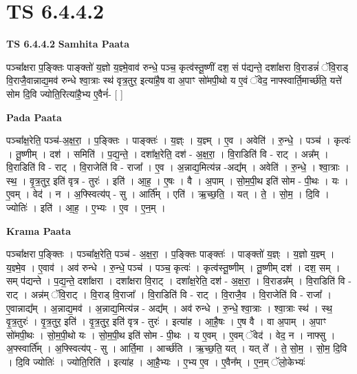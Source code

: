 \documentclass[17pt]{extarticle}
\begin{document}
\section{ TS 6.4.4.2 }

\textbf{TS 6.4.4.2 } \newline
\textbf{Samhita Paata} \newline

पञ्चा᳚क्षरा प॒ङ्क्तिः पाङ्क्तो॑ य॒ज्ञो य॒ज्ञ्मे॒वाव॑ रुन्धे॒ पञ्च॒ कृत्व॑स्तू॒ष्णीं दश॒ सं प॑द्यन्ते॒ दशा᳚क्षरा वि॒राडन्नं॑ ॅवि॒राड् वि॒राजै॒वान्नाद्य॒मव॑ रुन्धे श्वा॒त्राः स्थ॑ वृत्र॒तुर॒ इत्या॑है॒ष वा अ॒पाꣳ सो॑मपी॒थो य ए॒वं ॅवेद॒ नाफ्स्वार्ति॒मार्च्छ॑ति॒ यत्ते॑ सोम दि॒वि ज्योति॒रित्या॑है॒भ्य ए॒वैनं॑- [  ] \newline

\textbf{Pada Paata} \newline

पञ्चा᳚क्ष॒रेति॒ पञ्च॑-अ॒क्ष॒रा॒ । प॒ङ्क्तिः । पाङ्क्तः॑ । य॒ज्ञ्ः । य॒ज्ञ्म् । ए॒व । अवेति॑ । रु॒न्धे॒ । पञ्च॑ । कृत्वः॑ । तू॒ष्णीम् । दश॑ । समिति॑ । प॒द्य॒न्ते॒ । दशा᳚क्ष॒रेति॒ दश॑ - अ॒क्ष॒रा॒ । वि॒राडिति॑ वि - राट् । अन्न᳚म् । वि॒राडिति॑ वि - राट् । वि॒राजेति॑ वि - राजा᳚ । ए॒व । अ॒न्नाद्य॒मित्य॑न्न -अद्य᳚म् । अवेति॑ । रु॒न्धे॒ । श्वा॒त्राः । स्थ॒ । वृ॒त्र॒तुर॒ इति॑ वृत्र - तुरः॑ । इति॑ । आ॒ह॒ । ए॒षः । वै । अ॒पाम् । सो॒म॒पी॒थ इति॑ सोम - पी॒थः । यः । ए॒वम् । वेद॑ । न । अ॒फ्स्वित्य॑प् - सु । आर्ति᳚म् । एति॑ । ऋ॒च्छ॒ति॒ । यत् । ते॒ । सो॒म॒ । दि॒वि । ज्योतिः॑ । इति॑ । आ॒ह॒ । ए॒भ्यः । ए॒व । ए॒न॒म् ।  \newline


\textbf{Krama Paata} \newline

पञ्चा᳚क्षरा प॒ङ्‍क्तिः । पञ्चा᳚क्ष॒रेति॒ पञ्च॑ - अ॒क्ष॒रा॒ । प॒ङ्‍क्तिः पाङ्‍क्तः॑ । पाङ्‍क्तो॑ य॒ज्ञ्ः । य॒ज्ञो य॒ज्ञ्म् । य॒ज्ञ्मे॒व । ए॒वाव॑ । अव॑ रुन्धे । रु॒न्धे॒ पञ्च॑ । पञ्च॒ कृत्वः॑ । कृत्व॑स्तू॒ष्णीम् । तू॒ष्णीम् दश॑ । दश॒ सम् । सम् प॑द्यन्ते । प॒द्य॒न्ते॒ दशा᳚क्षरा । दशा᳚क्षरा वि॒राट् । दशा᳚क्ष॒रेति॒ दश॑ - अ॒क्ष॒रा॒ । वि॒राडन्न᳚म् । वि॒राडिति॑ वि - राट् । अन्न॑म् ॅवि॒राट् । वि॒राड् वि॒राजा᳚ । वि॒राडिति॑ वि - राट् । वि॒राजै॒व । वि॒राजेति॑ वि - राजा᳚ । ए॒वान्नाद्य᳚म् । अ॒न्नाद्य॒मव॑ । अ॒न्नाद्य॒मित्य॑न्न - अद्य᳚म् । अव॑ रुन्धे । रु॒न्धे॒ श्वा॒त्राः । श्वा॒त्राः स्थ॑ । स्थ॒ वृ॒त्र॒तुरः॑ । वृ॒त्र॒तुर॒ इति॑ । वृ॒त्र॒तुर॒ इति॑ वृत्र - तुरः॑ । इत्या॑ह । आ॒है॒षः । ए॒ष वै । वा अ॒पाम् । अ॒पाꣳ सो॑मपी॒थः । सो॒म॒पी॒थो यः । सो॒म॒पी॒थ इति॑ सोम - पी॒थः । य ए॒वम् । ए॒वम् ॅवेद॑ । वेद॒ न । नाफ्सु । अ॒फ्स्वार्ति᳚म् । अ॒फ्स्वित्य॑प् - सु । आर्ति॒मा । आर्च्छ॑ति । ऋ॒च्छ॒ति॒ यत् । यत् ते᳚ । ते॒ सो॒म॒ । सो॒म॒ दि॒वि । दि॒वि ज्योतिः॑ । ज्योति॒रिति॑ । इत्या॑ह । आ॒है॒भ्यः । ए॒भ्य ए॒व । ए॒वैन᳚म् । ए॒न॒म् ॅलो॒केभ्यः॑ \newline
\end{document}
